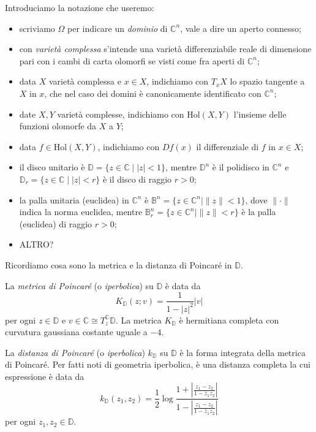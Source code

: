 Introduciamo la notazione che useremo:
\begin{itemize}
    \item scriviamo $\Omega$ per indicare un \textit{dominio} di $\mathbb{C}^n$, vale a dire un aperto connesso;
    \item con \textit{varietà complessa} s'intende una varietà differenziabile reale di dimensione pari con i cambi di carta olomorfi se visti come fra aperti di $\mathbb{C}^n$;
    \item data $X$ varietà complessa e $x \in X$, indichiamo con $T_xX$ lo spazio tangente a $X$ in $x$, che nel caso dei domini è canonicamente identificato con $\mathbb{C}^n$;
    \item date $X,Y$ varietà complesse, indichiamo con $\text{Hol}(X,Y)$ l'insieme delle funzioni olomorfe da $X$ a $Y$;
    \item data $f \in \text{Hol}(X,Y)$, indichiamo con $Df(x)$ il differenziale di $f$ in $x \in X$;
    \item il disco unitario è $\mathbb{D}=\{z \in \mathbb{C} \mid |z|<1\}$, mentre $\mathbb{D}^n$ è il polidisco in $\mathbb{C}^n$ e $\mathbb{D}_r=\{z \in \mathbb{C} \mid |z|<r\}$ è il disco di raggio $r>0$;
    \item la palla unitaria (euclidea) in $\mathbb{C}^n$ è $\mathbb{B}^n=\{z \in \mathbb{C}^n \mid \|z\|<1\}$, dove $\|\cdot\|$ indica la norma euclidea, mentre $\mathbb{B}_r^n=\{z \in \mathbb{C}^n \mid \|z\|<r\}$ è la palla (euclidea) di raggio $r>0$;
    \item ALTRO?
\end{itemize}

Ricordiamo cosa sono la metrica e la distanza di Poincaré in $\mathbb{D}$.

\begin{defn}
    La \textit{metrica di Poincaré} (o \textit{iperbolica}) su $\mathbb{D}$ è data da
    \begin{equation}
        K_{\mathbb{D}}(z;v)=\frac{1}{1-|z|^2}|v|
    \end{equation}
    per ogni $z \in \mathbb{D}$ e $v \in \mathbb{C}\cong T_z^{\mathbb{C}}\mathbb{D}$. La metrica $K_{\mathbb{D}}$ è hermitiana completa con curvatura gaussiana costante uguale a $-4$.
\end{defn}

\begin{defn}
    La \textit{distanza di Poincaré} (o \textit{iperbolica}) $k_{\mathbb{D}}$ su $\mathbb{D}$ è la forma integrata della metrica di Poincaré. Per fatti noti di geometria iperbolica, è una distanza completa la cui espressione è data da
    \begin{equation}
        k_{\mathbb{D}}(z_1,z_2)=\frac{1}{2}\log{\frac{1+\left|\frac{z_1-z_2}{1-\bar{z}_1z_2}\right|}{1-\left|\frac{z_1-z_2}{1-\bar{z}_1z_2}\right|}}
    \end{equation}
    per ogni $z_1,z_2 \in \mathbb{D}$.
\end{defn}

